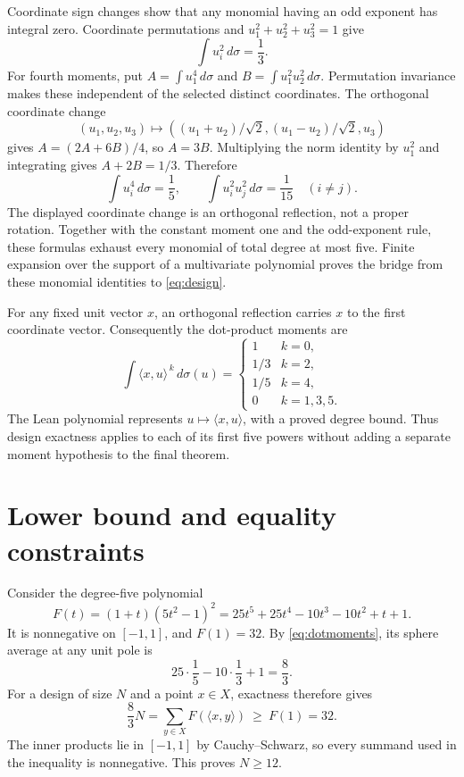 \documentclass[11pt]{article}
\newcommand{\ip}[2]{\langle #1,#2\rangle}
\newcommand{\code}[1]{\texttt{\detokenize{#1}}}
\begin{document}
Coordinate sign changes show that any monomial having an odd exponent has integral zero. Coordinate permutations and $u_1^2+u_2^2+u_3^2=1$ give
\[
 \int u_i^2\,d\sigma=\frac13.
\]
For fourth moments, put $A=\int u_1^4\,d\sigma$ and
$B=\int u_1^2u_2^2\,d\sigma$. Permutation invariance makes these independent of the selected distinct coordinates. The orthogonal coordinate change
\[
 (u_1,u_2,u_3)\longmapsto
 ((u_1+u_2)/\sqrt2,(u_1-u_2)/\sqrt2,u_3)
\]
gives $A=(2A+6B)/4$, so $A=3B$. Multiplying the norm identity by $u_1^2$ and integrating gives $A+2B=1/3$. Therefore
\begin{equation}\label{eq:moments}
 \int u_i^4\,d\sigma=\frac15,\qquad
 \int u_i^2u_j^2\,d\sigma=\frac1{15}\quad(i\ne j).
\end{equation}
The displayed coordinate change is an orthogonal reflection, not a proper rotation. Together with the constant moment one and the odd-exponent rule, these formulas exhaust every monomial of total degree at most five. Finite expansion over the support of a multivariate polynomial proves the bridge from these monomial identities to \eqref{eq:design}.

For any fixed unit vector $x$, an orthogonal reflection carries $x$ to the first coordinate vector. Consequently the dot-product moments are
\begin{equation}\label{eq:dotmoments}
 \int\ip{x}{u}^{\,k}\,d\sigma(u)=
 \begin{cases}1&k=0,\\1/3&k=2,\\1/5&k=4,\\0&k=1,3,5.\end{cases}
\end{equation}
The Lean polynomial \code{linearForm x} represents $u\mapsto\ip{x}{u}$, with a proved degree bound. Thus design exactness applies to each of its first five powers without adding a separate moment hypothesis to the final theorem.

\section{Lower bound and equality constraints}
Consider the degree-five polynomial
\[
 F(t)=(1+t)(5t^2-1)^2
     =25t^5+25t^4-10t^3-10t^2+t+1.
\]
It is nonnegative on $[-1,1]$, and $F(1)=32$. By \eqref{eq:dotmoments}, its sphere average at any unit pole is
\[
 25\cdot\frac15-10\cdot\frac13+1=\frac83.
\]
For a design of size $N$ and a point $x\in X$, exactness therefore gives
\begin{equation}\label{eq:lp}
 \frac83N=\sum_{y\in X}F(\ip{x}{y})\ \ge\ F(1)=32.
\end{equation}
The inner products lie in $[-1,1]$ by Cauchy--Schwarz, so every summand used in the inequality is nonnegative. This proves $N\ge12$.
\end{document}
